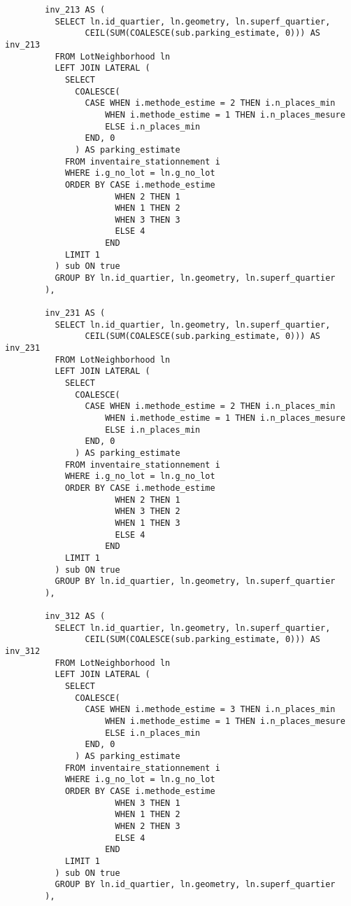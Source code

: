 \begin{lstlisting}
        inv_213 AS (
          SELECT ln.id_quartier, ln.geometry, ln.superf_quartier, 
                CEIL(SUM(COALESCE(sub.parking_estimate, 0))) AS inv_213
          FROM LotNeighborhood ln
          LEFT JOIN LATERAL (
            SELECT 
              COALESCE(
                CASE WHEN i.methode_estime = 2 THEN i.n_places_min
                    WHEN i.methode_estime = 1 THEN i.n_places_mesure
                    ELSE i.n_places_min
                END, 0
              ) AS parking_estimate
            FROM inventaire_stationnement i
            WHERE i.g_no_lot = ln.g_no_lot
            ORDER BY CASE i.methode_estime
                      WHEN 2 THEN 1
                      WHEN 1 THEN 2
                      WHEN 3 THEN 3
                      ELSE 4
                    END
            LIMIT 1
          ) sub ON true
          GROUP BY ln.id_quartier, ln.geometry, ln.superf_quartier
        ),

        inv_231 AS (
          SELECT ln.id_quartier, ln.geometry, ln.superf_quartier, 
                CEIL(SUM(COALESCE(sub.parking_estimate, 0))) AS inv_231
          FROM LotNeighborhood ln
          LEFT JOIN LATERAL (
            SELECT 
              COALESCE(
                CASE WHEN i.methode_estime = 2 THEN i.n_places_min
                    WHEN i.methode_estime = 1 THEN i.n_places_mesure
                    ELSE i.n_places_min
                END, 0
              ) AS parking_estimate
            FROM inventaire_stationnement i
            WHERE i.g_no_lot = ln.g_no_lot
            ORDER BY CASE i.methode_estime
                      WHEN 2 THEN 1
                      WHEN 3 THEN 2
                      WHEN 1 THEN 3
                      ELSE 4
                    END
            LIMIT 1
          ) sub ON true
          GROUP BY ln.id_quartier, ln.geometry, ln.superf_quartier
        ),

        inv_312 AS (
          SELECT ln.id_quartier, ln.geometry, ln.superf_quartier, 
                CEIL(SUM(COALESCE(sub.parking_estimate, 0))) AS inv_312
          FROM LotNeighborhood ln
          LEFT JOIN LATERAL (
            SELECT 
              COALESCE(
                CASE WHEN i.methode_estime = 3 THEN i.n_places_min
                    WHEN i.methode_estime = 1 THEN i.n_places_mesure
                    ELSE i.n_places_min
                END, 0
              ) AS parking_estimate
            FROM inventaire_stationnement i
            WHERE i.g_no_lot = ln.g_no_lot
            ORDER BY CASE i.methode_estime
                      WHEN 3 THEN 1
                      WHEN 1 THEN 2
                      WHEN 2 THEN 3
                      ELSE 4
                    END
            LIMIT 1
          ) sub ON true
          GROUP BY ln.id_quartier, ln.geometry, ln.superf_quartier
        ),


\end{lstlisting}
